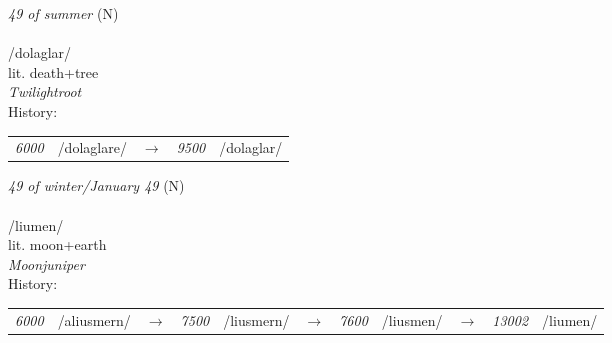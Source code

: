 \vspace{15pt}
\begin{nopagebreak}
 \textit{49 of summer} (N)\\
\\
\noindent /dol{\textprimstress}aglar/\\
\noindent lit. death+tree\\
\noindent \textit{Twilightroot}\\


\noindent History:

\vspace{-0pt}
\hspace{40pt}
\begin{tabular}{ccc}
\textit{6000} & /dolaglare/&$\rightarrow$ & \textit{9500} & /dolaglar/& \\
\end{tabular}

\vspace{20pt}\hline

\end{nopagebreak}
\filbreak



\vspace{15pt}
\begin{nopagebreak}
 \textit{49 of winter/January 49} (N)\\
\\
\noindent /li{\textprimstress}umen/\\
\noindent lit. moon+earth\\
\noindent \textit{Moonjuniper}\\


\noindent History:

\vspace{-0pt}
\hspace{40pt}
\begin{tabular}{ccc}
\textit{6000} & /aliusmern/&$\rightarrow$ & \textit{7500} & /liusmern/&$\rightarrow$ & \textit{7600} & /liusmen/&$\rightarrow$ & \textit{13002} & /liumen/& \\
\end{tabular}

\vspace{20pt}\hline

\end{nopagebreak}
\filbreak



